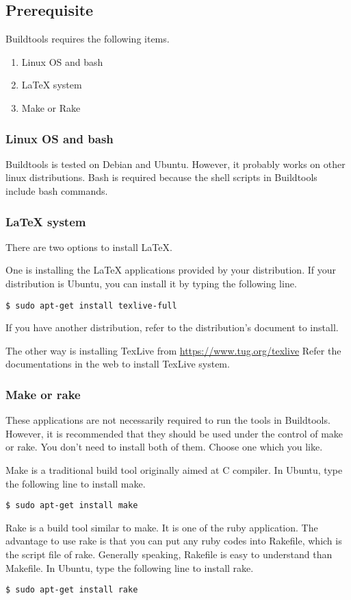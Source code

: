 \subsection{Prerequisite}
Buildtools requires the following items.
\begin{enumerate}
\item Linux OS and bash
\item LaTeX system
\item Make or Rake
\end{enumerate}

\subsubsection{Linux OS and bash}
Buildtools is tested on Debian and Ubuntu.
However, it probably works on other linux distributions.
Bash is required because the shell scripts in Buildtools include bash commands.
\subsubsection{LaTeX system}
There are two options to install LaTeX.

One is installing the LaTeX applications provided by your distribution.
If your distribution is Ubuntu, you can install it by typing the following line.
\begin{verbatim}
$ sudo apt-get install texlive-full
\end{verbatim}
If you have another distribution, refer to the distribution's document to install.

The other way is installing TexLive from \url{https://www.tug.org/texlive}
Refer the documentations in the web to install TexLive system.

\subsubsection{Make or rake}
These applications are not necessarily required to run the tools in Buildtools.
However, it is recommended that they should be used under the control of make or rake.
You don't need to install both of them.
Choose one which you like.

Make is a traditional build tool originally aimed at C compiler.
In Ubuntu, type the following line to install make.
\begin{verbatim}
$ sudo apt-get install make
\end{verbatim}

Rake is a build tool similar to make.
It is one of the ruby application.
The advantage to use rake is that you can put any ruby codes into Rakefile, which is the script file of rake.
Generally speaking, Rakefile is easy to understand than Makefile.
In Ubuntu, type the following line to install rake.
\begin{verbatim}
$ sudo apt-get install rake
\end{verbatim}

